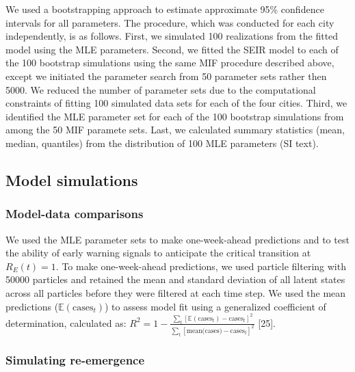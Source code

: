 \documentclass[3p]{elsarticle} %
\begin{document}
We used a bootstrapping approach to estimate approximate 95\% confidence
intervals for all parameters. The procedure, which was conducted for
each city independently, is as follows. First, we simulated 100
realizations from the fitted model using the MLE parameters. Second, we
fitted the SEIR model to each of the 100 bootstrap simulations using the
same MIF procedure described above, except we initiated the parameter
search from 50 parameter sets rather then 5000. We reduced the number of
parameter sets due to the computational constraints of fitting 100
simulated data sets for each of the four cities. Third, we identified
the MLE parameter set for each of the 100 bootstrap simulations from
among the 50 MIF paramete sets. Last, we calculated summary statistics
(mean, median, quantiles) from the distribution of 100 MLE parameters
(SI text).

\hypertarget{model-simulations}{%
\subsection{Model simulations}\label{model-simulations}}

\hypertarget{model-data-comparisons}{%
\subsubsection{Model-data comparisons}\label{model-data-comparisons}}

We used the MLE parameter sets to make one-week-ahead predictions and to
test the ability of early warning signals to anticipate the critical
transition at \(R_E(t) = 1\). To make one-week-ahead predictions, we
used particle filtering with 50000 particles and retained the mean and
standard deviation of all latent states across all particles before they
were filtered at each time step. We used the mean predictions
(\(\mathbb{E}(\text{cases}_t)\)) to assess model fit using a generalized
coefficient of determination, calculated as:
\(R^2 = 1 - \frac{\sum_t [\mathbb{E}(\text{cases}_t) - \text{cases}_t]^2}{\sum_t [\text{mean(cases)}-\text{cases}_t]^2}\)
{[}25{]}.

\hypertarget{simulating-re-emergence}{%
\subsubsection{Simulating re-emergence}\label{simulating-re-emergence}}
\end{document}
